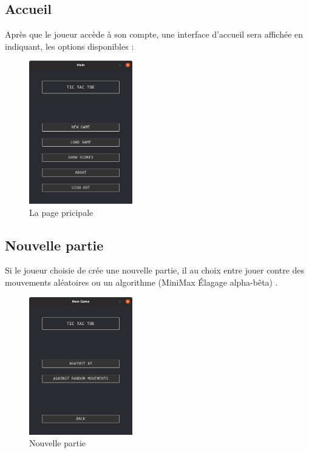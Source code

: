 \subsection{Accueil}
Après que le joueur accède à son compte, une interface d’accueil sera affichée en indiquant, les options disponibles :
\begin{figure}[H]
	\centering
	\includegraphics[width=0.4\textwidth]{main window.PNG}
	  \caption{La page pricipale}
	\label{fig:La page pricipale}
\end{figure}

\subsection{Nouvelle partie}
Si le joueur choisie de crée une nouvelle partie, il au choix entre jouer contre des mouvements aléatoires ou un algorithme (MiniMax Élagage alpha-bêta) .
\begin{figure}[H]
	\centering
	\includegraphics[width=0.4\textwidth]{new game button.PNG}
	  \caption{Nouvelle partie}
	\label{fig:Nouvelle Partie}
\end{figure}

